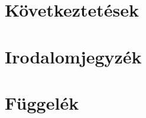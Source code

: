 \documentclass[12pt,a4paper,oneside]{report}
\begin{document}
\chapter{Következtetések}\label{sec:conc}

\renewcommand{\listfigurename}{Ábrák jegyzéke}
\listoffigures
\thispagestyle{empty}
\cleardoublepage

\renewcommand{\listtablename}{Táblázatok jegyzéke}
\listoftables
\thispagestyle{empty}
\cleardoublepage

\chapter{Irodalomjegyzék}\label{sec:irod}
\printbibliography[title={\ }]

\chapter{Függelék}\label{sec:dep}
\end{document}
